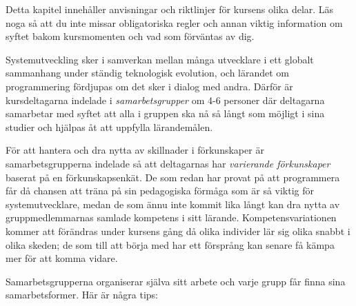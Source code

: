 

Detta kapitel innehåller anvisningar och riktlinjer för kursens olika delar. Läs noga så att du inte missar obligatoriska regler och annan viktig information om syftet bakom kursmomenten och vad som förväntas av dig. 


Systemutveckling sker i samverkan mellan många utvecklare i ett globalt sammanhang under ständig teknologisk evolution, och lärandet om programmering fördjupas om det sker i dialog med andra. Därför är kursdeltagarna indelade i \emph{samarbetsgrupper} om 4-6 personer där deltagarna samarbetar med syftet att alla i gruppen ska nå så långt som möjligt i sina studier och hjälpas åt att uppfylla lärandemålen. 

För att hantera och dra nytta av skillnader i förkunskaper är samarbetsgrupperna indelade så att deltagarnas har \emph{varierande förkunskaper} baserat på en förkunskapsenkät. De som redan har provat på att programmera får då chansen att träna på sin pedagogiska förmåga som är så viktig för systemutvecklare, medan de som ännu inte kommit lika långt kan dra nytta av gruppmedlemmarnas samlade kompetens i sitt lärande. Kompetensvariationen kommer att förändras under kursens gång då olika individer lär sig olika snabbt i olika skeden; de som till att börja med har ett försprång kan senare få kämpa mer för att komma vidare.

Samarbetsgrupperna organiserar själva sitt arbete och varje grupp får finna sina samarbetsformer. Här är några tips:


